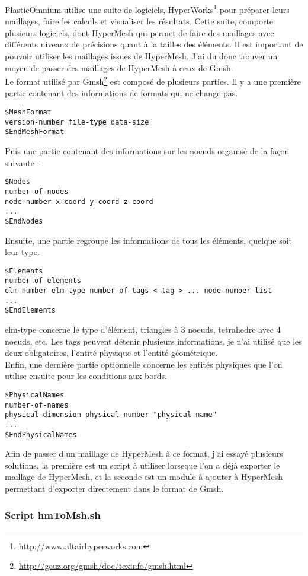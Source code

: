 PlasticOmnium utilise une suite de logiciels, HyperWorks\footnote{\url{http://www.altairhyperworks.com}} pour préparer leurs maillages, faire les calculs et visualiser les résultats. Cette suite, comporte plusieurs logiciels, dont HyperMesh qui permet de faire des maillages avec différents niveaux de précisions quant à la tailles des éléments. Il est important de pouvoir utiliser les maillages issues de HyperMesh. J'ai du donc trouver un moyen de passer des maillages de HyperMesh à ceux de Gmsh.\\
Le format utilisé par Gmsh\footnote{\url{http://geuz.org/gmsh/doc/texinfo/gmsh.html}} est composé de plusieurs parties. Il y a une première partie contenant des informations de formats qui ne change pas.
\begin{verbatim}
$MeshFormat
version-number file-type data-size
$EndMeshFormat
\end{verbatim} 
Puis une partie contenant des informations sur les noeuds organisé de la façon suivante :
\begin{verbatim}
$Nodes
number-of-nodes
node-number x-coord y-coord z-coord
...
$EndNodes
\end{verbatim}
Ensuite, une partie regroupe les informations de tous les éléments, quelque soit leur type.
\begin{verbatim}
$Elements
number-of-elements
elm-number elm-type number-of-tags < tag > ... node-number-list
...
$EndElements
\end{verbatim}
elm-type concerne le type d'élément, triangles à 3 noeuds, tetrahedre avec 4 noeuds, etc. Les tags peuvent détenir plusieurs informations, je n'ai utilisé que les deux obligatoires, l'entité physique et l'entité géométrique.\\
Enfin, une dernière partie optionnelle concerne les entités physiques que l'on utilise ensuite pour les conditions aux bords. 
\begin{verbatim}
$PhysicalNames
number-of-names
physical-dimension physical-number "physical-name"
...
$EndPhysicalNames
\end{verbatim}

Afin de passer d'un maillage de HyperMesh à ce format, j'ai essayé plusieurs solutions, la première est un script à utiliser lorseque l'on a déjà exporter le maillage de HyperMesh, et la seconde est un module à ajouter à HyperMesh permettant d'exporter directement dans le format de Gmsh. 

\subsubsection{Script hmToMsh.sh}

